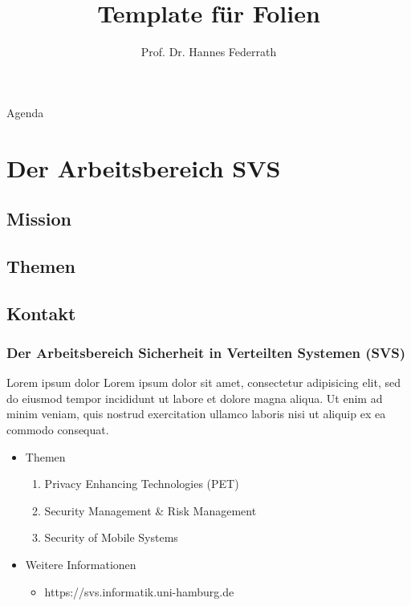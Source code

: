 \documentclass[t,aspectratio=169]{beamer}
\title{Template für Folien}
\author[Federrath]{Prof. Dr. Hannes Federrath}
\date{}
\begin{document}
\begin{frame}[plain]
	\maketitle
\end{frame}


\begin{frame}{Agenda}
	\tableofcontents
\end{frame}

\section{Der Arbeitsbereich SVS} %
\subsection{Mission} %
\subsection{Themen} %
\subsection{Kontakt} %

\begin{frame}
	\frametitle{Der Arbeitsbereich Sicherheit in Verteilten Systemen (SVS)}
	\begin{block}{Lorem ipsum dolor}
		Lorem ipsum dolor sit amet, consectetur adipisicing elit, sed do eiusmod tempor incididunt ut labore et dolore magna aliqua. Ut enim ad minim veniam, quis nostrud exercitation ullamco laboris nisi ut aliquip ex ea commodo consequat. 
	\end{block}
	\begin{itemize}
		\item Themen
			\begin{enumerate}
				\item Privacy Enhancing Technologies (PET)
				\item Security Management \& Risk Management
				\item Security of Mobile Systems
			\end{enumerate}
		\item Weitere Informationen
			\begin{itemize}
				\item https://svs.informatik.uni-hamburg.de
			\end{itemize}
	\end{itemize}
\end{frame}
\end{document}
